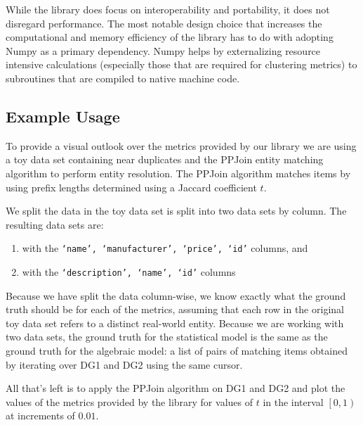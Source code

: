 \documentclass[a4paper,twoside]{article}
\begin{document}
    While the library does focus on interoperability and portability, it does
    not disregard performance.
    The most notable design choice that increases the computational and memory
    efficiency of the library has to do with adopting Numpy as a primary
    dependency.
    Numpy helps by externalizing resource intensive calculations (especially
    those that are required for clustering metrics) to subroutines that are
    compiled to native machine code.

    \subsection{Example Usage}

    To provide a visual outlook over the metrics provided by our library we are
    using a toy data set\cite{expdata2023} containing near duplicates and the
    PPJoin\cite{ppjoin} entity matching algorithm to perform entity resolution.
    The PPJoin algorithm matches items by using prefix lengths determined using
    a Jaccard coefficient $t$.
    
    We split the data in the toy data set is split into two data sets by column.
    The resulting data sets are:
    
    \begin{enumerate}[label={\bfseries DG\arabic*:},leftmargin=2cm]
        \item with the \texttt{`name', `manufacturer', `price', `id'} columns,
        and
        \item with the \texttt{`description', `name', `id'} columns\@
    \end{enumerate}

    Because we have split the data column-wise, we know exactly what the ground
    truth should be for each of the metrics, assuming that each row in the
    original toy data set refers to a distinct real-world entity.
    Because we are working with two data sets, the ground truth for the
    statistical model is the same as the ground truth for the algebraic model:
    a list of pairs of matching items obtained by iterating over DG1 and DG2
    using the same cursor.

    All that's left is to apply the PPJoin algorithm on DG1 and DG2 and plot the
    values of the metrics provided by the library for values of $t$ in the
    interval $\left[0, 1\right)$ at increments of $0.01$.
\end{document}
